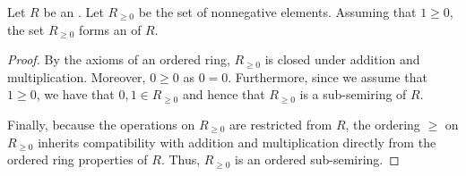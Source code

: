 \begin{lemma} \label{lemma:nonnegative_elements_of_an_ordered_ring_form_an_ordered_semiring}
    Let $R$ be an . Let $R_{\geq 0}$ be the set of nonnegative elements. Assuming that $1 \geq 0$, the set $R_{\geq 0}$ forms an  of $R$.
\end{lemma}
\begin{proof}
    By the axioms of an ordered ring, $R_{\geq 0}$ is closed under addition and multiplication. Moreover, $0 \geq 0$ as $0 = 0$. Furthermore, since we assume that $1 \geq 0$, we have that $0,1 \in R_{\geq 0}$ and hence that $R_{\geq 0}$ is a sub-semiring of $R$.

    Finally, because the operations on $R_{\geq 0}$ are restricted from $R$, the ordering $\geq$ on $R_{\geq 0}$ 
    inherits compatibility with addition and multiplication directly from the ordered ring properties of $R$. 
    Thus, $R_{\geq 0}$ is an ordered sub-semiring.
\end{proof}
